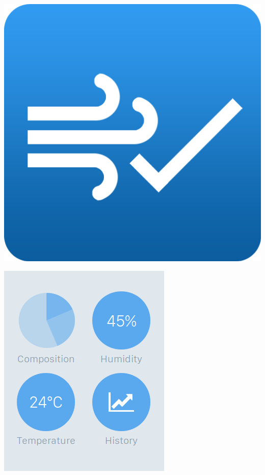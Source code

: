 \documentclass[a4paper,10pt]{article}
\begin{document}
\includegraphics[scale=0.4]{images/logo.png}

\includegraphics[scale=0.4]{images/home.png}
\end{document}
